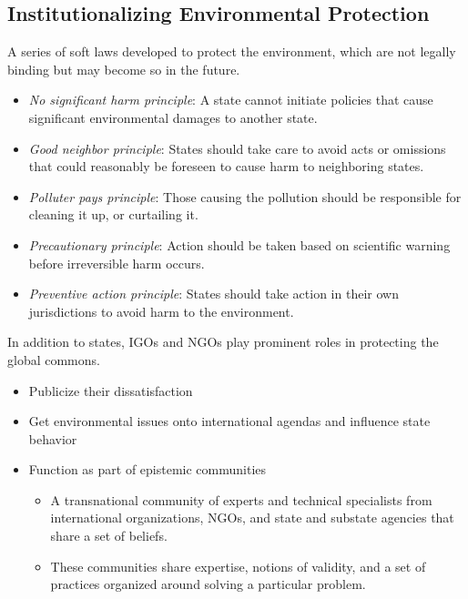 \documentclass[
]{book}
\begin{document}
\hypertarget{institutionalizing-environmental-protection}{%
\subsection{Institutionalizing Environmental Protection}\label{institutionalizing-environmental-protection}}

A series of soft laws developed to protect the environment, which are not legally binding but may become so in the future.

\begin{itemize}
\item
  \emph{No significant harm principle}: A state cannot initiate policies that cause significant environmental damages to another state.
\item
  \emph{Good neighbor principle}: States should take care to avoid acts or omissions that could reasonably be foreseen to cause harm to neighboring states.
\item
  \emph{Polluter pays principle}: Those causing the pollution should be responsible for cleaning it up, or curtailing it.
\item
  \emph{Precautionary principle}: Action should be taken based on scientific warning before irreversible harm occurs.
\item
  \emph{Preventive action principle}: States should take action in their own jurisdictions to avoid harm to the environment.
\end{itemize}

In addition to states, IGOs and NGOs play prominent roles in protecting the global commons.

\begin{itemize}
\item
  Publicize their dissatisfaction
\item
  Get environmental issues onto international agendas and influence state behavior
\item
  Function as part of epistemic communities

  \begin{itemize}
  \item
    A transnational community of experts and technical specialists from international organizations, NGOs, and state and substate agencies that share a set of beliefs.
  \item
    These communities share expertise, notions of validity, and a set of practices organized around solving a particular problem.
  \end{itemize}
\end{itemize}
\end{document}
